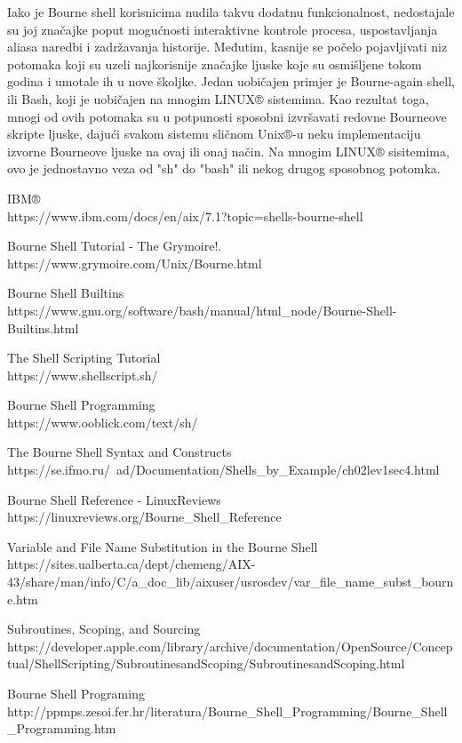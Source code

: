 \documentclass[11pt]{book}
\begin{document}
Iako je Bourne shell korisnicima nudila takvu dodatnu funkcionalnost, nedostajale su joj značajke poput mogućnosti interaktivne kontrole procesa, uspostavljanja aliasa naredbi i zadržavanja historije. Međutim, kasnije se počelo pojavljivati niz potomaka koji su uzeli najkorisnije značajke ljuske koje su osmišljene tokom godina i umotale ih u nove školjke. Jedan uobičajen primjer je Bourne-again shell, ili Bash, koji je uobičajen na mnogim LINUX® sistemima. Kao rezultat toga, mnogi od ovih potomaka su u potpunosti sposobni izvršavati redovne Bourneove skripte ljuske, dajući svakom sistemu sličnom Unix®-u neku implementaciju izvorne Bourneove ljuske na ovaj ili onaj način. Na mnogim LINUX® sisitemima, ovo je jednostavno veza od "sh" do "bash" ili nekog drugog sposobnog potomka.


\begin{thebibliography}{10} %
\bibitem[1]{} 
IBM®\\
https://www.ibm.com/docs/en/aix/7.1?topic=shells-bourne-shell

\bibitem[2]{} 
Bourne Shell Tutorial - The Grymoire!.\\
https://www.grymoire.com/Unix/Bourne.html

\bibitem[3]{}
Bourne Shell Builtins\\
https://www.gnu.org/software/bash/manual/html_node/Bourne-Shell-Builtins.html

\bibitem[4]{}
The Shell Scripting Tutorial\\
https://www.shellscript.sh/

\bibitem[5]{}
Bourne Shell Programming\\
https://www.ooblick.com/text/sh/

\bibitem[6]{}
The Bourne Shell Syntax and Constructs\\
https://se.ifmo.ru/~ad/Documentation/Shells_by_Example/ch02lev1sec4.html

\bibitem[7]{}
Bourne Shell Reference - LinuxReviews\\
https://linuxreviews.org/Bourne_Shell_Reference

\bibitem[8]{}
Variable and File Name Substitution in the Bourne Shell\\
https://sites.ualberta.ca/dept/chemeng/AIX-43/share/man/info/C/a_doc_lib/aixuser/usrosdev/var_file_name_subst_bourne.htm

\bibitem[9]{}
Subroutines, Scoping, and Sourcing\\
https://developer.apple.com/library/archive/documentation/OpenSource/Conceptual/ShellScripting/SubroutinesandScoping/SubroutinesandScoping.html

\bibitem[10]{}
Bourne Shell Programing\\
http://ppmps.zesoi.fer.hr/literatura/Bourne_Shell_Programming/Bourne_Shell_Programming.htm
\end{thebibliography}
\end{document}
